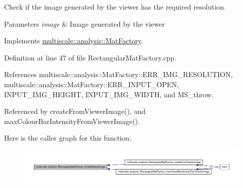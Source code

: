 \-Check if the image generated by the viewer has the required resolution. 


\begin{DoxyParams}{\-Parameters}
{\em image} & \-Image generated by the viewer \\
\hline
\end{DoxyParams}


\-Implements \hyperlink{classmultiscale_1_1analysis_1_1MatFactory_ad6acdd120b128eb9fb502fca23a7de69}{multiscale\-::analysis\-::\-Mat\-Factory}.



\-Definition at line 47 of file \-Rectangular\-Mat\-Factory.\-cpp.



\-References multiscale\-::analysis\-::\-Mat\-Factory\-::\-E\-R\-R\-\_\-\-I\-M\-G\-\_\-\-R\-E\-S\-O\-L\-U\-T\-I\-O\-N, multiscale\-::analysis\-::\-Mat\-Factory\-::\-E\-R\-R\-\_\-\-I\-N\-P\-U\-T\-\_\-\-O\-P\-E\-N, \-I\-N\-P\-U\-T\-\_\-\-I\-M\-G\-\_\-\-H\-E\-I\-G\-H\-T, \-I\-N\-P\-U\-T\-\_\-\-I\-M\-G\-\_\-\-W\-I\-D\-T\-H, and \-M\-S\-\_\-throw.



\-Referenced by create\-From\-Viewer\-Image(), and max\-Colour\-Bar\-Intensity\-From\-Viewer\-Image().



\-Here is the caller graph for this function\-:
\nopagebreak
\begin{figure}[H]
\begin{center}
\leavevmode
\includegraphics[width=350pt]{classmultiscale_1_1analysis_1_1RectangularMatFactory_a398913bbfa8ca9d80cb630c29a37a135_icgraph}
\end{center}
\end{figure}


